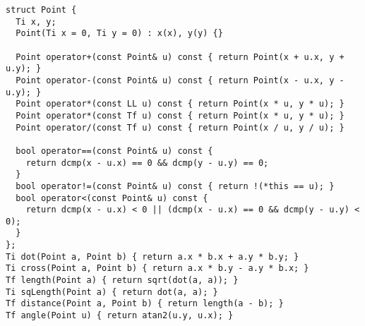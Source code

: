 \documentclass[FSZ,a4paper,onesided]{article}
\begin{document}
\begin{multicols*}{\COLS}
\begin{lstlisting}
struct Point {
  Ti x, y;
  Point(Ti x = 0, Ti y = 0) : x(x), y(y) {}

  Point operator+(const Point& u) const { return Point(x + u.x, y + u.y); }
  Point operator-(const Point& u) const { return Point(x - u.x, y - u.y); }
  Point operator*(const LL u) const { return Point(x * u, y * u); }
  Point operator*(const Tf u) const { return Point(x * u, y * u); }
  Point operator/(const Tf u) const { return Point(x / u, y / u); }

  bool operator==(const Point& u) const {
    return dcmp(x - u.x) == 0 && dcmp(y - u.y) == 0;
  }
  bool operator!=(const Point& u) const { return !(*this == u); }
  bool operator<(const Point& u) const {
    return dcmp(x - u.x) < 0 || (dcmp(x - u.x) == 0 && dcmp(y - u.y) < 0);
  }
};
Ti dot(Point a, Point b) { return a.x * b.x + a.y * b.y; }
Ti cross(Point a, Point b) { return a.x * b.y - a.y * b.x; }
Tf length(Point a) { return sqrt(dot(a, a)); }
Ti sqLength(Point a) { return dot(a, a); }
Tf distance(Point a, Point b) { return length(a - b); }
Tf angle(Point u) { return atan2(u.y, u.x); }


\end{lstlisting}
\end{multicols*}
\end{document}

